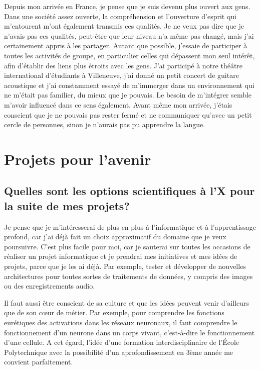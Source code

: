 \documentclass[a4paper,12pt]{article}
\begin{document}
Depuis mon arrivée en France, je pense que je suis devenu plus ouvert aux gens. Dans une société assez ouverte, la compréhension et l'ouverture d'esprit qui m'entourent m'ont également transmis ces qualités. Je ne veux pas dire que je n'avais pas ces qualités, peut-être que leur niveau n'a même pas changé, mais j'ai certainement appris à les partager. Autant que possible, j'essaie de participer à toutes les activités de groupe, en particulier celles qui dépassent mon seul intérêt, afin d'établir des liens plus étroits avec les gens. J'ai participé à notre théâtre international d'étudiants à Villeneuve, j'ai donné un petit concert de guitare acoustique et j'ai constamment essayé de m'immerger dans un environnement qui ne m'était pas familier, du mieux que je pouvais. Le besoin de m'intégrer semble m'avoir influencé dans ce sens également. Avant même mon arrivée, j'étais conscient que je ne pouvais pas rester fermé et ne communiquer qu'avec un petit cercle de personnes, sinon je n'aurais pas pu apprendre la langue. 





	\section{Projets pour l'avenir}
	\subsection{Quelles sont les options scientifiques à l’X pour la suite de mes projets?}
	Je pense que je m'intéresserai de plus en plus à l'informatique et à l'apprentissage profond, car j'ai déjà fait un choix approximatif du domaine que je veux poursuivre. C'est plus facile pour moi, car je sauterai sur toutes les occasions de réaliser un projet informatique et je prendrai mes initiatives et mes idées de projets, parce que je les ai déjà. Par exemple, tester et développer de nouvelles architectures pour toutes sortes de traitements de données, y compris des images ou des enregistrements audio. 
	
	Il faut aussi être conscient de sa culture et que les idées peuvent venir d'ailleurs que de son cœur de métier. Par exemple, pour comprendre les fonctions eurétiques des activations dans les réseaux neuronaux, il faut comprendre le fonctionnement d'un neurone dans un corps vivant, c'est-à-dire le fonctionnement d'une cellule. A cet égard, l'idée d'une formation interdisciplinaire de l'École Polytechnique avec la possibilité d'un aprofondissement en 3ème année me convient parfaitement. 
\end{document}
